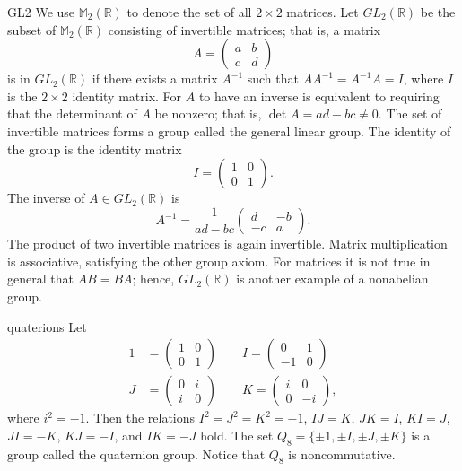 \begin{example}{GL2}
We use  ${\mathbb M}_2 ( {\mathbb R})$\label{notematrices} to denote the set of all $2 \times 2$ matrices.  Let $GL_2({\mathbb R})$ be the subset of ${\mathbb M}_2 ( {\mathbb R})$ consisting of invertible matrices; that is, a matrix 
\[
A =
\begin{pmatrix}
a & b \\
c & d
\end{pmatrix}
\]
is in  $GL_2( {\mathbb R})$ if there exists a matrix $A^{-1}$ such that
$A A^{-1} = A^{-1} A = I$, where $I$ is the $2 \times 2$ identity
matrix. For $A$ to have an inverse is equivalent to requiring that the
determinant of $A$ be nonzero; that is, $\det A = ad - bc \neq
0$\label{determinant}. The set of invertible matrices forms a group
called the {\bfi general linear group}\label{generallinear}. The identity of the group is the
identity matrix  
\[
I =
\begin{pmatrix}
1 & 0 \\
0 & 1
\end{pmatrix}.
\]
The inverse of $A \in GL_2( {\mathbb R})$ is
\[
A^{-1} =
\frac{1}{ad-bc}
\begin{pmatrix}
d & -b \\
-c & a
\end{pmatrix}.
\]
The product of two invertible matrices is again invertible. Matrix
multiplication is associative, satisfying the other group axiom. For
matrices it is not true in general that $AB = BA$; hence, $GL_2(
{\mathbb R})$ is another example of a nonabelian group.
\end{example}


 
 
\begin{example}{quaterions}
Let
\begin{align*}
1
& = 
\begin{pmatrix}
1 & 0 \\
0 & 1
\end{pmatrix}
\qquad
I
=
\begin{pmatrix}
0 & 1 \\
-1 & 0
\end{pmatrix}
\\
J
& = 
\begin{pmatrix}
0 & i \\
i & 0
\end{pmatrix}
\qquad
K =
\begin{pmatrix}
i & 0 \\
0 & -i
\end{pmatrix},
\end{align*}
where $i^2 = -1$. Then the relations $I^2 = J^2 = K^2 = -1$, $IJ=K$,
$JK=I$, $KI=J$, $JI=-K$, $KJ=-I$, and $IK=-J$ hold. The set
$Q_8\label{notequateriongroup} = \{
\pm 1, \pm I, \pm J, \pm K  \}$ is a group called the {\bfi quaternion
group}. Notice that  $Q_8$
is noncommutative. 
\end{example}
 

